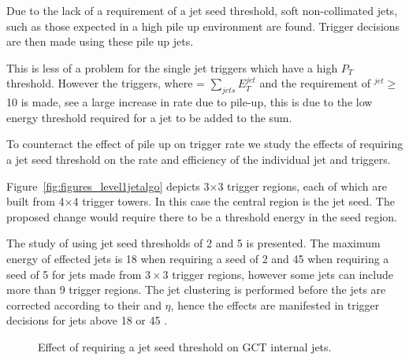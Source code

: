 Due to the lack of a requirement of a jet seed threshold, soft non-collimated jets, such as
those expected in a high pile up environment are found. Trigger decisions are then made using these pile up jets.

This is less of a problem for the single jet triggers which have a high $P_{T}$ threshold.
However the \HT triggers, where \HT = $\sum_{jets}E_{T}^{jet}$ and the requirement of \ET$^{jet} \geq $10 \GeV is made,
see a large increase in rate due to pile-up, this is due to the low energy threshold required for a jet to be added to the \HT sum.

To counteract the effect of pile up on trigger rate we study the effects of requiring a jet
seed threshold on the rate and efficiency of the individual jet and \HT triggers.

Figure~\ref{fig:figures_level1jetalgo} depicts 3$\times$3 trigger regions, each of which are built from 4$\times$4 trigger towers.
In this case the central region is the jet seed. The proposed change would require there to be a threshold energy in the seed
region.

The study of using jet seed thresholds of 2 and 5 \GeV is presented. The maximum energy of effected jets is 18 \GeV when 
requiring a seed of 2 \GeV and 45 \GeV when requiring a seed of 5 \GeV for jets made from $3\times3$ trigger regions, however 
some jets can include more than 9 trigger regions. The jet clustering is performed before the \Lone jets are corrected according 
to their \ET and $\eta$, hence the effects are manifested in trigger decisions for \Lone jets above 18 or 45 \GeV.



\begin{figure}[h!]
    \centering
    \caption{Effect of requiring a jet seed threshold on GCT internal jets.}
    \label{fig:GCTrank}
\end{figure}


